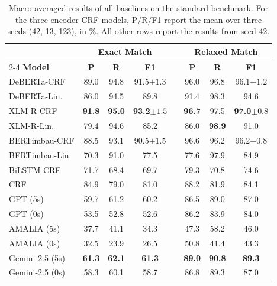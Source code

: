 \documentclass[11pt]{article}
\begin{document}
\begin{table}[ht!]
\centering
\caption{Macro averaged results of all baselines on the standard benchmark. For the three encoder-CRF models, P/R/F1 report the mean over three seeds (42, 13, 123), in \%. All other rows report the results from seed 42.}
\label{tab:main_results_compact}
\footnotesize
\setlength{\tabcolsep}{0pt}
\begin{tabular*}{\columnwidth}{@{\extracolsep{\fill}} l ccc c ccc @{}}
\toprule
& \multicolumn{3}{c}{\textbf{Exact Match}} && \multicolumn{3}{c}{\textbf{Relaxed Match}} \\
\cmidrule{2-4} \cmidrule{6-8}
\textbf{Model} & \textbf{P} & \textbf{R} & \textbf{F1} && \textbf{P} & \textbf{R} & \textbf{F1} \\
\midrule
DeBERTa-CRF      & 89.0 & 94.8 & 91.5${\pm 1.3}$ && 96.0 & 96.8 & 96.1${\pm 1.2}$ \\
DeBERTa-Lin.     & 86.0 & 94.5 & 89.8 && 91.4 & 98.3 & 94.6 \\
XLM-R-CRF        & \textbf{91.8} & \textbf{95.0} & \textbf{93.2${\pm 1.5}$} && \textbf{96.7} & 97.5 & \textbf{97.0${\pm 0.8}$} \\
XLM-R-Lin.       & 79.4 & 94.6 & 85.2 && 86.0 & \textbf{98.9} & 91.0 \\
BERTimbau-CRF    & 88.5 & 93.1 & 90.5${\pm 1.5}$ && 96.6 & 96.2 & 96.2${\pm 0.8}$ \\
BERTimbau-Lin.   & 70.3 & 91.0 & 77.5 && 77.6 & 97.9 & 84.9 \\
BiLSTM-CRF        & 71.7 & 68.4 & 69.7 && 79.3 & 70.8 & 74.6 \\
CRF              & 84.9 & 79.0 & 81.0 && 88.2 & 81.9 & 84.1 \\
\midrule
GPT (5s)         & 59.7 & 61.2 & 60.2 && 86.5 & 89.0 & 87.0 \\
GPT (0s)         & 53.5 & 52.8 & 52.6 && 86.2 & 83.9 & 84.0 \\
AMALIA (5s)      & 37.7 & 41.1 & 34.3 && 47.3 & 58.2 & 46.0 \\
AMALIA (0s)      & 32.5 & 23.9 & 26.5 && 50.8 & 41.4 & 43.3 \\
Gemini-2.5 (5s)  & \textbf{61.3} & \textbf{62.1} & \textbf{61.3} && \textbf{89.0} & \textbf{90.8} & \textbf{89.3} \\
Gemini-2.5 (0s)  & 58.3 & 60.1 & 58.7 && 86.8 & 89.3 & 87.0 \\
\bottomrule
\end{tabular*}
\end{table}
    
\end{document}
